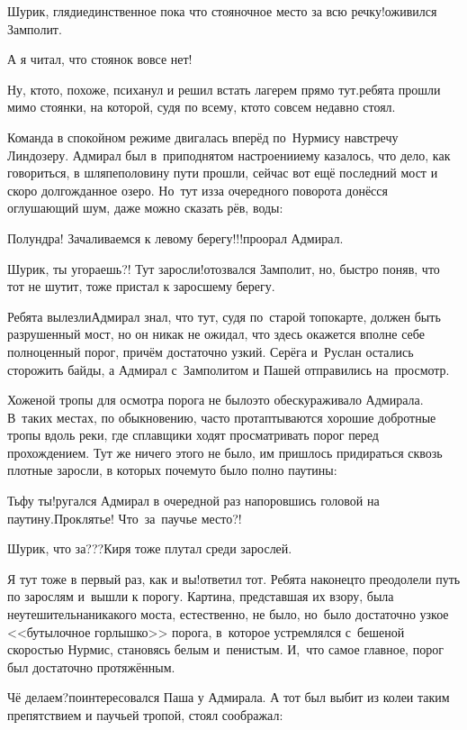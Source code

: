 \diagdash Шурик, гляди\mdash единственное пока что стояночное место за всю речку!\mdash оживился Замполит.

\diagdash А я читал, что стоянок вовсе нет!

\diagdash Ну, кто\sdash то, похоже, психанул и решил встать лагерем прямо тут.\mdash ребята прошли мимо стоянки, на которой, судя по всему, кто\sdash то совсем недавно стоял.

Команда в спокойном режиме двигалась вперёд по~Нурмису навстречу Линдозеру. Адмирал был в~приподнятом настроении\mdash ему казалось, что дело, как говориться, в шляпе\mdash половину пути прошли, сейчас вот ещё последний мост и скоро долгожданное озеро. Но~тут из\sdash за очередного поворота донёсся оглушающий шум, даже можно сказать рёв, воды:

\diagdash Полундра! Зачаливаемся к левому берегу!!!\mdash проорал Адмирал.

\diagdash Шурик, ты угораешь?! Тут заросли!\mdash отозвался Замполит, но, быстро поняв, что тот не шутит, тоже пристал к заросшему берегу.

Ребята вылезли\mdash Адмирал знал, что тут, судя по~старой топокарте, должен быть разрушенный мост, но он никак не ожидал, что здесь окажется вполне себе полноценный порог, причём достаточно узкий. Серёга и~Руслан остались сторожить байды, а Адмирал с~Замполитом и Пашей отправились на~просмотр. 

Хоженой тропы для осмотра порога не было\mdash это обескураживало Адмирала. В~таких местах, по обыкновению, часто протаптываются хорошие добротные тропы вдоль реки, где сплавщики ходят просматривать порог перед прохождением. Тут же ничего этого не было, им пришлось придираться сквозь плотные заросли, в которых почему\sdash то было полно паутины:

\diagdash Тьфу ты!\mdash ругался Адмирал в очередной раз напоровшись головой на паутину.\mdash Проклятье! Что~за~паучье место?!

\diagdash Шурик, что за???\mdash Киря тоже плутал среди зарослей.

\diagdash Я тут тоже в первый раз, как и вы!\mdash ответил тот. Ребята наконец\sdash то преодолели путь по зарослям и~вышли к порогу. Картина, представшая их взору, была неутешительна\mdash никакого моста, естественно, не было, но~было достаточно узкое <<бутылочное горлышко>> порога, в~которое устремлялся с~бешеной скоростью Нурмис, становясь белым и~пенистым. И,~что самое главное, порог был достаточно протяжённым. 

\diagdash Чё делаем?\mdash поинтересовался Паша у Адмирала. А тот был выбит из колеи таким препятствием и паучьей тропой, стоял соображал:

